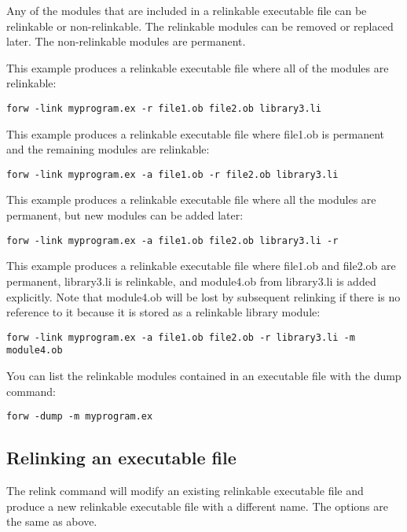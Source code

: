 \documentclass[forwardcom.tex]{subfiles}
\begin{document}
Any of the modules that are included in a relinkable executable file can be relinkable or non-relinkable. The relinkable modules can be removed or replaced later. The non-relinkable modules are permanent. 
\vv

This example produces a relinkable executable file where all of the modules are relinkable:
\begin{lstlisting}[frame=single]
forw -link myprogram.ex -r file1.ob file2.ob library3.li
\end{lstlisting}
\vspace{4mm}

This example produces a relinkable executable file where file1.ob is permanent and the remaining modules are relinkable:
\begin{lstlisting}[frame=single]
forw -link myprogram.ex -a file1.ob -r file2.ob library3.li
\end{lstlisting}
\vspace{4mm}

This example produces a relinkable executable file where all the modules are permanent, but new modules can be added later:
\begin{lstlisting}[frame=single]
forw -link myprogram.ex -a file1.ob file2.ob library3.li -r
\end{lstlisting}
\vspace{4mm}

This example produces a relinkable executable file where file1.ob and file2.ob are permanent,  library3.li is relinkable, and module4.ob from library3.li is added explicitly. Note that module4.ob
will be lost by subsequent relinking if there is no reference to it because it is stored as a relinkable library module:
\begin{lstlisting}[frame=single]
forw -link myprogram.ex -a file1.ob file2.ob -r library3.li -m module4.ob
\end{lstlisting}
\vspace{4mm}

You can list the relinkable modules contained in an executable file with the dump command:
\begin{lstlisting}[frame=single]
forw -dump -m myprogram.ex
\end{lstlisting}
\vspace{4mm}


\subsection{Relinking an executable file} \label{relinking}
The relink command will modify an existing relinkable executable file and produce a new relinkable executable file with a different name. The options are the same as above. 
\vv
\end{document}
